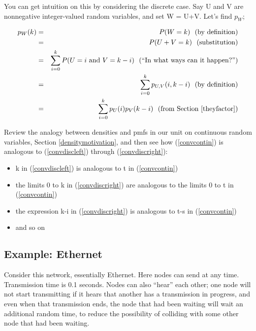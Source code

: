 You can get intuition on this by considering the discrete case.  Say U
and V are nonnegative integer-valued random variables, and set W = U+V.
Let's find $p_W$;

\begin{eqnarray}
\label{convdiscleft}
p_W(k) &=& P(W = k) ~~ (\textrm{by definition}) \\ 
&=& P(U + V = k) ~~ (\textrm{substitution}) \\
&=& \sum_{i=0}^k P(U = i \textrm{ and } V = k-i) ~~ (\textrm{``In what ways can it happen?''}) \\
&=& \sum_{i=0}^k p_{U,V}(i,k-i) ~~ (\textrm{by definition}) \\
&=& \sum_{i=0}^k p_U(i) p_V(k-i)  ~~ (\textrm{from Section \ref{theyfactor}})
\label{convdiscright}
\end{eqnarray}

Review the analogy between densities and pmfs in our unit on continuous
random variables, Section \ref{densitymotivation}, and then see how
(\ref{convcontin}) is analogous to (\ref{convdiscleft}) through
(\ref{convdiscright}):  

\begin{itemize}

\item k in  
(\ref{convdiscleft})
is analogous to t in 
(\ref{convcontin}) 

\item the limits 0 to k in  
(\ref{convdiscright})
are analogous to the limits 0 to t in 
(\ref{convcontin}) 

\item the expression k-i in  
(\ref{convdiscright})
is analogous to t-s in 
(\ref{convcontin}) 

\item and so on

\end{itemize}

\subsection{Example:  Ethernet}
\label{ethernetex}

Consider this network, essentially Ethernet.  Here nodes can send at any
time.  Transmission time is 0.1 seconds.  Nodes can also ``hear'' each
other; one node will not start transmitting if it hears that another has
a transmission in progress, and even when that transmission ends, the
node that had been waiting will wait an additional random time, to
reduce the possibility of colliding with some other node that had been
waiting.


